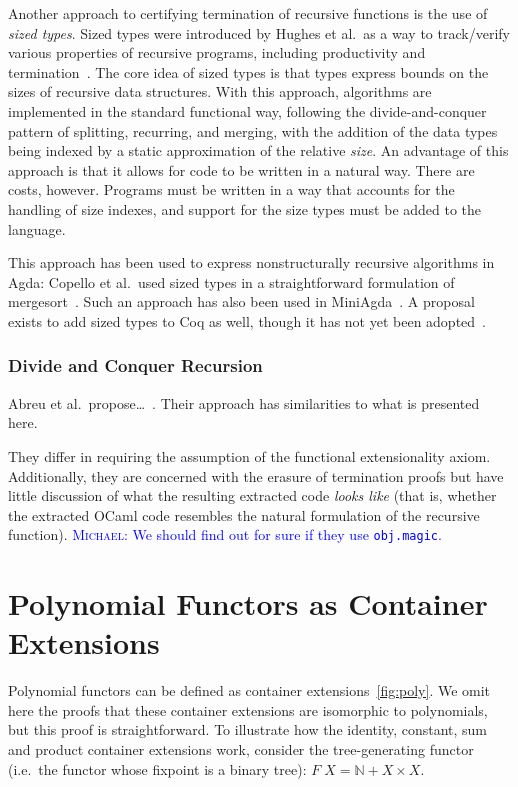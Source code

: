 \documentclass[anonymous, a4paper, UKenglish, cleveref, autoref, thm-restate]{lipics-v2021}
\newcommand{\mvol}[1]{\textcolor{blue}{\textsc{Michael}: #1}}
\begin{document}
Another approach to certifying termination of recursive functions is the use of
\emph{sized types}. Sized types were introduced by Hughes et al.\ as a way to
track/verify various properties of recursive programs, including productivity
and termination~\cite{HughesPS96}. The core idea of sized types is that types
express bounds on the sizes of recursive data structures. With this approach,
algorithms are implemented in the standard functional way, following the
divide-and-conquer pattern of splitting, recurring, and merging, with the
addition of the data types being indexed by a static approximation of the
relative \emph{size}. An advantage of this approach is that it allows for code
to be written in a natural way. There are costs, however. Programs must be
written in a way that accounts for the handling of size indexes, and support for
the size types must be added to the language.

This approach has been used to express nonstructurally recursive
algorithms in Agda: Copello et al.\ used sized types in a straightforward
formulation of mergesort~\cite{CopelloTB14}. Such an approach has also been used
in MiniAgda~\cite{abs-1202-3496}. A proposal exists to add sized types to
Coq as well, though it has not yet been adopted~\cite{CHAN_2023}.

\subsubsection{Divide and Conquer Recursion}

Abreu et al.\ propose\ldots~\cite{AbreuDHJMS23}. Their approach has similarities to what is presented here.

They differ in requiring the assumption of the functional extensionality axiom.
Additionally, they are concerned with the erasure of termination proofs but have
little discussion of what the resulting extracted code \emph{looks like} (that
is, whether the extracted OCaml code resembles the natural formulation of the
recursive function).
\mvol{We should find out for sure if they use \texttt{obj.magic}.}



\appendix
\section{Polynomial Functors as Container Extensions}
\label{sec:pol-containers}
Polynomial functors can be defined as container extensions~\ref{fig:poly}. We
omit here the proofs that these container extensions are isomorphic to
polynomials, but this proof is straightforward. To illustrate how the identity,
constant, sum and product container extensions work, consider the
tree-generating functor (i.e.\ the functor whose fixpoint is a binary tree):
$F\; X = \mathbb{N} + X \times X$.
\end{document}
